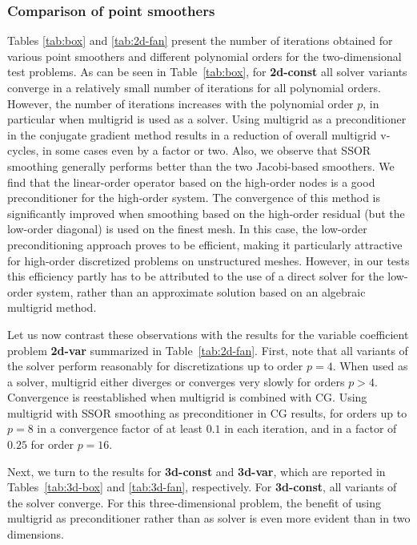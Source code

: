 \documentclass[smallcondensed,final]{svjour3}     %
\begin{document}
\subsubsection{Comparison of point smoothers}\label{subsec:num_point}
Tables \ref{tab:box} and \ref{tab:2d-fan} present the number of
iterations obtained for various point smoothers and different
polynomial orders for the two-dimensional test problems. As can be
seen in Table~\ref{tab:box}, for {\bf 2d-const}
all solver variants converge in a
relatively small number of iterations for all polynomial
orders. However, the number of
iterations increases with the polynomial order $p$, in particular when
multigrid is used as a solver. Using multigrid as a preconditioner in
the conjugate gradient method results in a reduction of overall
multigrid v-cycles, in some cases even by a factor or two. Also, we
observe that SSOR smoothing generally performs better than the two
Jacobi-based smoothers. We find that the linear-order operator based
on the high-order nodes is a good preconditioner for the high-order
system. The convergence of this method is significantly improved when
smoothing based on the high-order residual (but the low-order
diagonal) is used on the finest mesh.
In this case, the low-order preconditioning approach proves to
be efficient, making it particularly attractive for high-order
discretized problems on unstructured meshes. However, in our tests
this efficiency partly has to be attributed to the use of a direct
solver for the low-order system, rather than an approximate solution
based on an algebraic multigrid method.

Let us now contrast these observations with the results for the
variable coefficient problem {\bf 2d-var} summarized in Table~\ref{tab:2d-fan}. First,
note that all variants of the solver perform reasonably for discretizations up to
order $p=4$. When used as a solver, multigrid either diverges or
converges very slowly for orders $p>4$. Convergence is reestablished
when multigrid is combined with CG. Using multigrid with SSOR
smoothing as preconditioner in CG results, for orders up to $p=8$ in a
convergence factor of at least $0.1$ in each iteration, and in a
factor of $0.25$ for order $p=16$.

Next, we turn to the results for {\bf 3d-const} and {\bf 3d-var},
which are reported in Tables~\ref{tab:3d-box} and \ref{tab:3d-fan},
respectively. For {\bf 3d-const}, all variants of the solver
converge. For this three-dimensional problem, the benefit of using
multigrid as preconditioner rather than as solver is even more evident
than in two dimensions.
\end{document}
